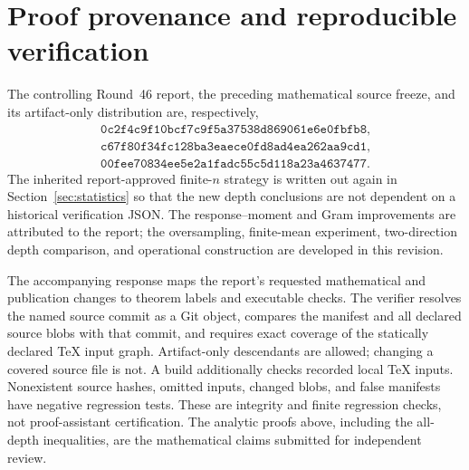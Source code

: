 \section{Proof provenance and reproducible verification}
The controlling Round~46 report, the preceding mathematical source freeze,
and its artifact-only distribution are, respectively,
\begin{gather*}
 \texttt{0c2f4c9f10bcf7c9f5a37538d869061e6e0fbfb8},\\
 \texttt{c67f80f34fc128ba3eaece0fd8ad4ea262aa9cd1},\\
 \texttt{00fee70834ee5e2a1fadc55c5d118a23a4637477}.
\end{gather*}
The inherited report-approved finite-$n$ strategy is written out again in
Section~\ref{sec:statistics} so that the new depth conclusions are not dependent
on a historical verification JSON. The response--moment and Gram improvements
are attributed to the report; the oversampling, finite-mean experiment,
two-direction depth comparison, and operational construction are developed
in this revision.

The accompanying response maps the report's requested mathematical and
publication changes to theorem labels and executable checks. The verifier
resolves the named source commit as a Git object, compares the manifest and
all declared source blobs with that commit, and requires exact coverage of the
statically declared TeX input graph. Artifact-only descendants are allowed;
changing a covered source file is not. A build additionally checks recorded
local TeX inputs. Nonexistent source hashes, omitted inputs, changed blobs,
and false manifests have negative regression tests. These are integrity and
finite regression checks, not proof-assistant certification. The analytic
proofs above, including the all-depth inequalities, are the mathematical
claims submitted for independent review.

